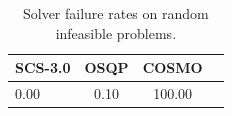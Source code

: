 \begin{table}
\centering
\caption{Solver failure rates on random infeasible problems.}
\label{t-random infeasible-failure}
\begin{tabular}{lccc}
\toprule
 SCS-3.0 &  OSQP &  COSMO \\
\midrule
    0.00 &  0.10 & 100.00 \\
\bottomrule
\end{tabular}
\end{table}
